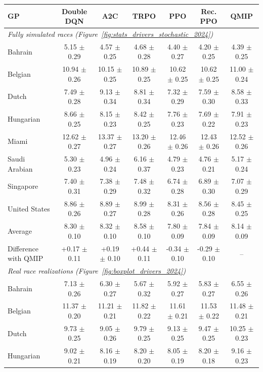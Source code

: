\begin{tabular}{lcccccc}
\toprule
GP & Double DQN & A2C & TRPO & PPO & Rec. PPO & QMIP \\
\midrule
\multicolumn{7}{l}{\textit{Fully simulated races (Figure~\ref{fig:stats_drivers_stochastic_2024})}} \\
\midrule
Bahrain & 5.15 $\pm$ 0.29 & 4.57 $\pm$ 0.25 & 4.68 $\pm$ 0.28 & 4.40 $\pm$ 0.27 & 4.20 $\pm$ 0.25 & 4.39 $\pm$ 0.25 \\
Belgian & 10.94 $\pm$ 0.26 & 10.15 $\pm$ 0.25 & 10.89 $\pm$ 0.25 & 10.62 $\pm$ 0.25 & 10.62 $\pm$ 0.25 & 11.00 $\pm$ 0.24 \\
Dutch & 7.49 $\pm$ 0.28 & 9.13 $\pm$ 0.34 & 8.81 $\pm$ 0.34 & 7.32 $\pm$ 0.29 & 7.59 $\pm$ 0.30 & 8.58 $\pm$ 0.33 \\
Hungarian & 8.66 $\pm$ 0.25 & 8.15 $\pm$ 0.23 & 8.42 $\pm$ 0.25 & 7.76 $\pm$ 0.23 & 7.69 $\pm$ 0.22 & 7.91 $\pm$ 0.23 \\
Miami & 12.62 $\pm$ 0.27 & 13.37 $\pm$ 0.27 & 13.20 $\pm$ 0.26 & 12.46 $\pm$ 0.26 & 12.43 $\pm$ 0.26 & 12.52 $\pm$ 0.26 \\
Saudi Arabian & 5.30 $\pm$ 0.23 & 4.96 $\pm$ 0.24 & 6.16 $\pm$ 0.37 & 4.79 $\pm$ 0.23 & 4.76 $\pm$ 0.21 & 5.17 $\pm$ 0.24 \\
Singapore & 7.40 $\pm$ 0.31 & 7.38 $\pm$ 0.29 & 7.48 $\pm$ 0.32 & 6.74 $\pm$ 0.28 & 6.89 $\pm$ 0.30 & 7.07 $\pm$ 0.29 \\
United States & 8.86 $\pm$ 0.26 & 8.89 $\pm$ 0.27 & 8.99 $\pm$ 0.28 & 8.31 $\pm$ 0.26 & 8.56 $\pm$ 0.28 & 8.45 $\pm$ 0.25 \\
\midrule
Average & 8.30 $\pm$ 0.10 & 8.32 $\pm$ 0.10 & 8.58 $\pm$ 0.10 & 7.80 $\pm$ 0.09 & 7.84 $\pm$ 0.09 & 8.14 $\pm$ 0.09 \\
Difference with QMIP & +0.17 $\pm$ 0.11 & +0.19 $\pm$ 0.10 & +0.44 $\pm$ 0.11 & -0.34 $\pm$ 0.10 & -0.29 $\pm$ 0.10 & -- \\
\midrule
\multicolumn{7}{l}{\textit{Real race realizations (Figure~\ref{fig:boxplot_drivers_2024})}} \\
\midrule
Bahrain & 7.13 $\pm$ 0.26 & 6.30 $\pm$ 0.27 & 5.67 $\pm$ 0.32 & 5.92 $\pm$ 0.27 & 5.83 $\pm$ 0.27 & 6.55 $\pm$ 0.26 \\
Belgian & 11.37 $\pm$ 0.20 & 11.21 $\pm$ 0.21 & 11.82 $\pm$ 0.22 & 11.61 $\pm$ 0.21 & 11.53 $\pm$ 0.22 & 11.48 $\pm$ 0.21 \\
Dutch & 9.73 $\pm$ 0.25 & 9.05 $\pm$ 0.26 & 9.79 $\pm$ 0.25 & 9.13 $\pm$ 0.25 & 9.47 $\pm$ 0.25 & 10.25 $\pm$ 0.23 \\
Hungarian & 9.02 $\pm$ 0.21 & 8.16 $\pm$ 0.19 & 8.20 $\pm$ 0.20 & 8.05 $\pm$ 0.19 & 8.20 $\pm$ 0.18 & 9.16 $\pm$ 0.23 \\

\end{tabular}
